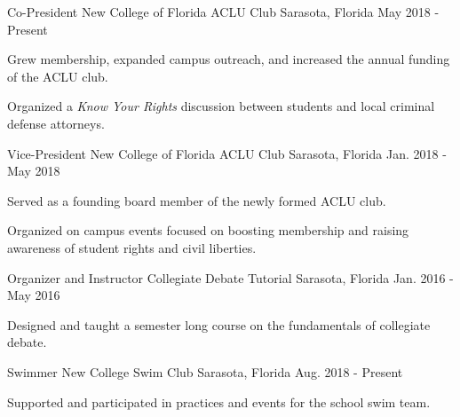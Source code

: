 

\begin{cventries}


  \cventry
    {Co-President} %
    {New College of Florida ACLU Club} %
    {Sarasota, Florida} %
    {May 2018 - Present} %
    {
      \begin{cvitems} %
        \item {Grew membership, expanded campus outreach, and increased the annual funding of the ACLU club.}
        \item {Organized a \emph{Know Your Rights} discussion between students and local criminal defense attorneys.}
      \end{cvitems}
    }

  \cventry
    {Vice-President} %
    {New College of Florida ACLU Club} %
    {Sarasota, Florida} %
    {Jan. 2018 - May 2018} %
    {
      \begin{cvitems} %
        \item {Served as a founding board member of the newly formed ACLU club.}
        \item {Organized on campus events focused on boosting membership and raising awareness of student rights and civil liberties.}
      \end{cvitems}
    }

  \cventry
    {Organizer and Instructor} %
    {Collegiate Debate Tutorial} %
    {Sarasota, Florida} %
    {Jan. 2016 - May 2016} %
    {
      \begin{cvitems} %
        \item {Designed and taught a semester long course on the fundamentals of collegiate debate.}
      \end{cvitems}
    }

  \cventry
    {Swimmer} %
    {New College Swim Club} %
    {Sarasota, Florida} %
    {Aug. 2018 - Present} %
    {
      \begin{cvitems} %
        \item {Supported and participated in practices and events for the school swim team.}
      \end{cvitems}
    }


\end{cventries}
